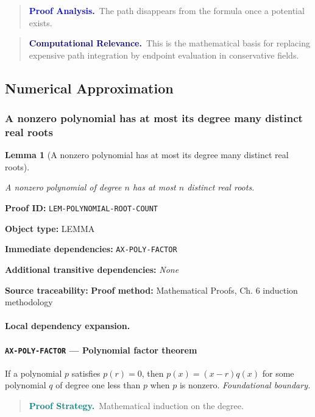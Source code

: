 \documentclass[10pt]{article}
\newcommand{\pidraw}[1]{\begingroup\urlstyle{tt}\nolinkurl{#1}\endgroup}
\newtheorem{lemma}[theorem]{Lemma}
\theoremstyle{definition}
\theoremstyle{remark}
\newenvironment{proofstrategy}
{\begin{quote}\small\noindent\textbf{\textcolor{teal}{Proof Strategy.}}\ }
{\end{quote}}
\newenvironment{proofanalysis}
{\begin{quote}\small\noindent\textbf{\textcolor{blue}{Proof Analysis.}}\ }
{\end{quote}}
\newenvironment{computationalrelevance}
{\begin{quote}\small\noindent\textbf{\textcolor{navy}{Computational Relevance.}}\ }
{\end{quote}}
\newcommand{\meta}[2]{\noindent\textbf{#1:} #2\par}
\begin{document}
\begin{proofanalysis}The path disappears from the formula once a potential exists.\end{proofanalysis}

\begin{computationalrelevance}This is the mathematical basis for replacing expensive path integration by endpoint evaluation in conservative fields.\end{computationalrelevance}

\subsection{Numerical Approximation}

\subsubsection{A nonzero polynomial has at most its degree many distinct real roots}

\begin{lemma}[A nonzero polynomial has at most its degree many distinct real roots]\label{prf:LEM-POLYNOMIAL-ROOT-COUNT}

A nonzero polynomial of degree $n$ has at most $n$ distinct real roots.

\end{lemma}

\meta{Proof ID}{\pidraw{LEM-POLYNOMIAL-ROOT-COUNT}}
\meta{Object type}{LEMMA}
\meta{Immediate dependencies}{\pidraw{AX-POLY-FACTOR}}
\meta{Additional transitive dependencies}{\emph{None}}
\meta{Source traceability}{\textbf{Proof method:} Mathematical Proofs, Ch. 6 induction methodology}

\paragraph{Local dependency expansion.}

\paragraph{\pidraw{AX-POLY-FACTOR} --- Polynomial factor theorem}
If a polynomial $p$ satisfies $p(r)=0$, then $p(x)=(x-r)q(x)$ for some polynomial $q$ of degree one less than $p$ when $p$ is nonzero.
\textit{Foundational boundary.}

\begin{proofstrategy}Mathematical induction on the degree.\end{proofstrategy}
\end{document}
